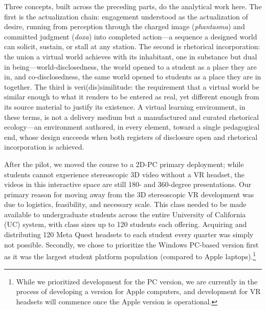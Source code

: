 
Three concepts, built across the preceding parts, do the analytical work here.
The first is the actualization chain: engagement understood as the actualization
of desire, running from perception through the charged image
(\textit{phantasma}) and committed judgment (\textit{doxa}) into completed
action---a sequence a designed world can solicit, sustain, or stall at any
station. The second is rhetorical incorporation: the union a virtual world
achieves with its inhabitant, one in substance but dual in
being---world-disclosedness, the world opened to a student as a place they are
in, and co-disclosedness, the same world opened to students as a place they are
in together. The third is veri(dis)similitude: the requirement that a virtual
world be similar enough to what it renders to be entered as real, yet different
enough from its source material to justify its existence. A virtual learning
environment, in these terms, is not a delivery medium but a manufactured and
curated rhetorical ecology---an environment authored, in every element, toward a
single pedagogical end, whose design succeeds when both registers of disclosure
open and rhetorical incorporation is achieved.


After the pilot, we moved the course to a 2D-PC primary
deployment; while students cannot experience stereoscopic 3D video without a VR
headset, the videos in this interactive space are still 180- and 360-degree
presentations. Our primary reason for moving away from the 3D stereoscopic VR
development was due to logistics, feasibility, and necessary scale. This class
needed to be made available to undergraduate students across the entire
University of California (UC) system, with class sizes up to 120 students each
offering. Acquiring and distributing 120 Meta Quest headsets to each student
every quarter was simply not possible. Secondly, we chose to prioritize the
Windows PC-based version first as it was the largest student platform population
(compared to Apple laptops).\footnote{While we prioritized development for the
PC version, we are currently in the process of developing a version for Apple
computers, and development for VR headsets will commence once the Apple version
is operational.}

